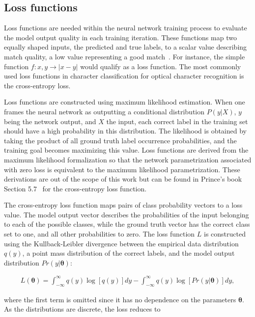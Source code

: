 \documentclass[english,twoside,openright]{UH_DS_MSc}
\begin{document}
\subsection{Loss functions}
\label{sect:loss_funcs}

Loss functions are needed within the neural network training process to evaluate the model output 
quality in each training iteration. These functions map two equally shaped inputs, the predicted 
and true labels, to a scalar value describing match quality, a low value representing a good match~\cite{princebook}. 
For instance, the simple function $f: x,y \rightarrow |x-y|$  would qualify as a loss function.
The most commonly used loss functions in character classification for optical character recognition is 
the cross-entropy loss.

Loss functions are constructed using maximum likelihood estimation. When one frames the neural network as outputting 
a conditional distribution $P(y|X)$, $y$ being the network output, and $X$ the input, each correct label in the 
training set should have a high probability in this distribution. The likelihood is obtained by taking the product of 
all ground truth label occurrence probabilities, and the training goal becomes maximizing this value. Loss functions are derived 
from the maximum likelihood formalization so that the network parametrization associated with zero loss is equivalent to 
the maximum likelihood parametrization. These derivations are out of the scope of this work but can be found in Prince's book
Section 5.7~\cite{princebook} for the cross-entropy loss function.

The cross-entropy loss function maps pairs of class probability vectors 
to a loss value. The model output vector describes the probabilities 
of the input belonging to each of the possible classes, while the ground
 truth vector has the correct 
class set to one, and all other probabilities to zero. The loss function $L$ 
is constructed using the Kullback-Leibler divergence between the empirical data distribution $q(y)$,
a point mass distribution of the correct labels,
 and the model output distribution 
$Pr(y|\mathbf{\theta})$:

\begin{align}
    L(\mathbf{\theta})=\int_{-\infty}^{\infty}q(y)\log[q(y)]dy-\int_{-\infty}^{\infty}q(y)\log[Pr(y|\mathbf{\theta})]dy,
\end{align}

where the first term is omitted since it has no dependence on the parameters $\mathbf{\theta}$.
As the distributions are discrete, the loss reduces to
\end{document}
